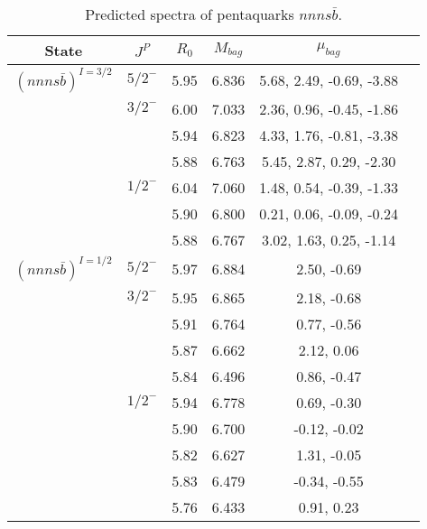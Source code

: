 \documentclass[prd,twocolumn,floatfix,nofootinbib]{revtex4}
\begin{document}
\renewcommand{\tabcolsep}{0.5cm}
\renewcommand{\arraystretch}{1.2}
\begin{table*}[!htbp]
    \caption{Predicted spectra of pentaquarks $nnns\bar{b}$.}
    \begin{tabular}{cccccc}
        \hline\hline
        {\rm State} &$J^{P}$ &$R_{0}$ &$M_{bag}$ &$\mu_{bag}$  \\ \hline
        ${(nnns\bar{b})}^{I=3/2}$
            &${5/2}^{-}$    &5.95   &6.836  &5.68, 2.49, -0.69, -3.88    \\
            &${3/2}^{-}$    &6.00   &7.033  &2.36, 0.96, -0.45, -1.86  \\
            &               &5.94   &6.823  &4.33, 1.76, -0.81, -3.38  \\
            &               &5.88   &6.763  &5.45, 2.87, 0.29, -2.30 \\
            &${1/2}^{-}$    &6.04   &7.060  &1.48, 0.54, -0.39, -1.33  \\
            &               &5.90   &6.800  &0.21, 0.06, -0.09, -0.24  \\
            &               &5.88   &6.767  &3.02, 1.63, 0.25, -1.14  \\
        ${(nnns\bar{b})}^{I=1/2}$
            &${5/2}^{-}$    &5.97   &6.884  &2.50, -0.69  \\
            &${3/2}^{-}$    &5.95   &6.865  &2.18, -0.68  \\
            &               &5.91   &6.764  &0.77, -0.56  \\
            &               &5.87   &6.662  &2.12, 0.06  \\
            &               &5.84   &6.496  &0.86, -0.47  \\
            &${1/2}^{-}$    &5.94   &6.778  &0.69, -0.30  \\
            &               &5.90   &6.700  &-0.12, -0.02  \\
            &               &5.82   &6.627  &1.31, -0.05  \\
            &               &5.83   &6.479  &-0.34, -0.55  \\
            &               &5.76   &6.433  &0.91, 0.23  \\
        \hline\hline
    \end{tabular}
\end{table*}
\end{document}
